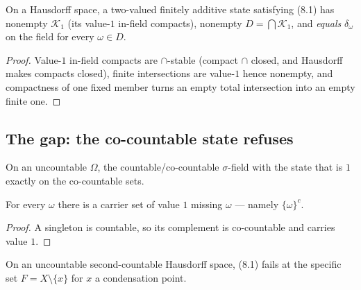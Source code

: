 \begin{theorem}
  \label{thm:dirac-forcing}
  \leanok
  On a Hausdorff space, a two-valued finitely additive state satisfying (8.1)
  has nonempty $\mathcal{K}_1$ (its value-$1$ in-field compacts), nonempty
  $D = \bigcap \mathcal{K}_1$, and \emph{equals} $\delta_\omega$ on the field
  for every $\omega \in D$.
\end{theorem}

\begin{proof}
  \leanok
  Value-$1$ in-field compacts are $\cap$-stable (compact $\cap$ closed, and
  Hausdorff makes compacts closed), finite intersections are value-$1$ hence
  nonempty, and compactness of one fixed member turns an empty total
  intersection into an empty finite one.
\end{proof}

\subsection{The gap: the co-countable state refuses}

\begin{definition}
  \label{def:cocountable-state}
  \leanok
  On an uncountable $\Omega$, the countable/co-countable $\sigma$-field with the
  state that is $1$ exactly on the co-countable sets.
\end{definition}

\begin{lemma}
  \label{lem:cocountable-not-dirac}
  \leanok
  For every $\omega$ there is a carrier set of value $1$ missing $\omega$ ---
  namely $\{\omega\}^{c}$.
\end{lemma}

\begin{proof}
  \leanok
  A singleton is countable, so its complement is co-countable and carries
  value $1$.
\end{proof}

\begin{theorem}
  \label{thm:cocountable-fails-81}
  \leanok
  On an uncountable second-countable Hausdorff space, (8.1) fails at the
  specific set $F = X \setminus \{x\}$ for $x$ a condensation point.
\end{theorem}

